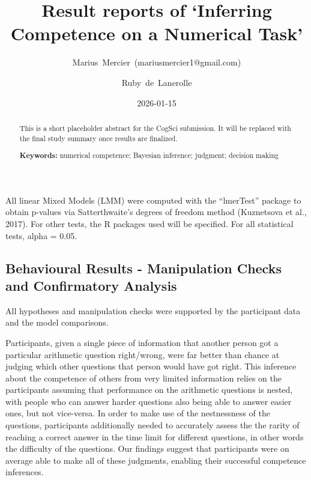 \documentclass[
  10pt,
  letterpaper]{article}
\author[1]{\mbox{Marius Mercier (mariusmercier1@gmail.com)}}
\author[2]{\mbox{Ruby de Lanerolle}}
\affil[1]{IJN}
\affil[2]{UCL}
\title{Result reports of `Inferring Competence on a Numerical Task'}
\author{}
\date{\vspace{-2.5em}2026-01-15}
\begin{document}
\maketitle
\begin{abstract}
This is a short placeholder abstract for the CogSci submission. It will be
replaced with the final study summary once results are finalized.

\textbf{Keywords:} numerical competence; Bayesian inference; judgment; decision making
\end{abstract}

All linear Mixed Models (LMM) were computed with the ``lmerTest'' package to obtain p-values via Satterthwaite's degrees of freedom method (Kuznetsova et al., 2017). For other tests, the R packages used will be specified. For all statistical tests, alpha = 0.05.

\subsection{Behavioural Results - Manipulation Checks and Confirmatory Analysis}\label{behavioural-results---manipulation-checks-and-confirmatory-analysis}

All hypotheses and manipulation checks were supported by the participant data and the model comparisons.

Participants, given a single piece of information that another person got a particular arithmetic question right/wrong, were far better than chance at judging which other questions that person would have got right. This inference about the competence of others from very limited information relies on the participants assuming that performance on the arithmetic questions is nested, with people who can answer harder questions also being able to answer easier ones, but not vice-versa. In order to make use of the nestnessness of the questions, participants additionally needed to accurately assess the the rarity of reaching a correct answer in the time limit for different questions, in other words the difficulty of the questions. Our findings suggest that participants were on average able to make all of these judgments, enabling their successful competence inferences.
\end{document}
